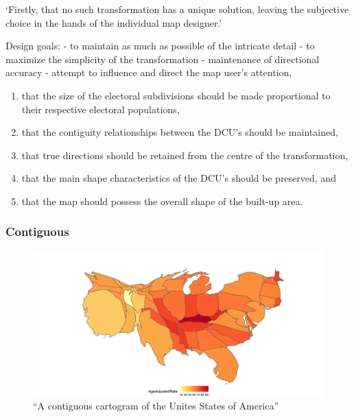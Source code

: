 \documentclass[11pt,]{article}
\providecommand{\tightlist}{%
  \setlength{\itemsep}{0pt}\setlength{\parskip}{0pt}}
\begin{document}
`Firstly, that no such transformation has a unique solution, leaving the
subjective choice in the hands of the individual map designer.'

Design goals: - to maintain as much as possible of the intricate detail
- to maximize the simplicity of the transformation - maintenance of
directional accuracy - attempt to influence and direct the map user's
attention,

\begin{enumerate}
\def\labelenumi{\arabic{enumi})}
\tightlist
\item
  that the size of the electoral subdivisions should be made
  proportional to their respective electoral populations,
\item
  that the contiguity relationships between the DCU's should be
  maintained,
\item
  that true directions should be retained from the centre of the
  transformation,
\item
  that the main shape characteristics of the DCU's should be preserved,
  and
\item
  that the map should possess the overall shape of the built-up area.
\end{enumerate}

\hypertarget{contiguous}{%
\subsubsection{Contiguous}\label{contiguous}}

\begin{figure}
\centering
\includegraphics{figures/ggcont.png}
\caption{``A contiguous cartogram of the Unites States of America''}
\end{figure}
\end{document}
